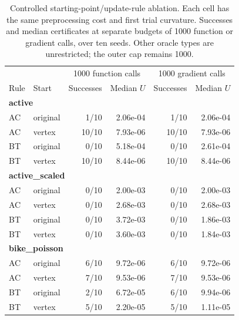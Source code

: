 \begin{table}[htbp]
\centering\small
\caption{Controlled starting-point/update-rule ablation. Each cell has the same preprocessing cost and first trial curvature. Successes and median certificates at separate budgets of 1000 function or gradient calls, over ten seeds. Other oracle types are unrestricted; the outer cap remains 1000.}
\label{tab:factorial}
\begin{tabular}{llrrrr}
\hline
 & & \multicolumn{2}{c}{1000 function calls} & \multicolumn{2}{c}{1000 gradient calls} \\
Rule & Start & Successes & Median $U$ & Successes & Median $U$ \\
\hline
\multicolumn{6}{l}{\textbf{active}} \\
AC & original & 1/10 & 2.06e-04 & 1/10 & 2.06e-04 \\
AC & vertex & 10/10 & 7.93e-06 & 10/10 & 7.93e-06 \\
BT & original & 0/10 & 5.18e-04 & 0/10 & 2.61e-04 \\
BT & vertex & 10/10 & 8.44e-06 & 10/10 & 8.44e-06 \\
\hline
\multicolumn{6}{l}{\textbf{active\_scaled}} \\
AC & original & 0/10 & 2.00e-03 & 0/10 & 2.00e-03 \\
AC & vertex & 0/10 & 2.68e-03 & 0/10 & 2.68e-03 \\
BT & original & 0/10 & 3.72e-03 & 0/10 & 1.86e-03 \\
BT & vertex & 0/10 & 3.60e-03 & 0/10 & 1.84e-03 \\
\hline
\multicolumn{6}{l}{\textbf{bike\_poisson}} \\
AC & original & 6/10 & 9.72e-06 & 6/10 & 9.72e-06 \\
AC & vertex & 7/10 & 9.53e-06 & 7/10 & 9.53e-06 \\
BT & original & 2/10 & 6.72e-05 & 6/10 & 9.94e-06 \\
BT & vertex & 5/10 & 2.20e-05 & 5/10 & 1.11e-05 \\
\hline
\end{tabular}
\end{table}
